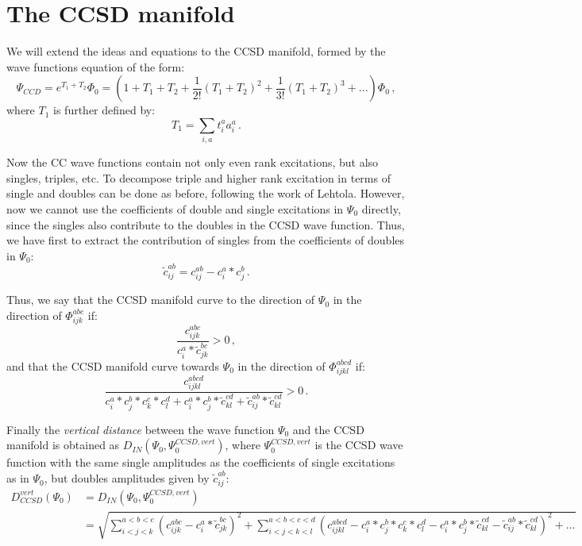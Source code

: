 \section{The CCSD manifold}
We will extend the ideas and equations to the CCSD manifold, formed by the wave functions equation
of the form:
\begin{equation}
  \Psi_{CCD} = e^{T_1 + T_2} \Phi_0 =
  \left(1 + T_1 + T_2 + \frac{1}{2!}(T_1 + T_2)^2 + \frac{1}{3!}(T_1 + T_2)^3 + ...\right) \Phi_0\,,
\end{equation}
where $T_1$ is further defined by:
\begin{equation}
  T_1 = \sum_{i,a} t_i^a a_i^a\,.
\end{equation}

Now the CC wave functions contain not only even rank excitations,
but also singles, triples, etc.
To decompose triple and higher rank excitation in terms of single and doubles can be done
as before, following the work of Lehtola.
However, now we cannot use the coefficients of double and single excitations in $\Psi_0$
directly, since the singles also contribute to the doubles in the CCSD wave function.
Thus,
we have first to extract the contribution of singles from the coefficients of doubles in $\Psi_0$:
\begin{equation}
  \tilde{c}_{ij}^{ab} = c_{ij}^{ab} - c_i^a * c_j^b\,.
\end{equation}

Thus, we say that the CCSD manifold curve to the direction of $\Psi_0$ in the direction of
$\Phi_{ijk}^{abc}$ if:
\begin{equation}
  \frac{c_{ijk}^{abc}}{c_{i}^{a} * \tilde{c}_{jk}^{bc}} > 0\,,
\end{equation}
and that the CCSD manifold curve towards $\Psi_0$ in the direction of
$\Phi_{ijkl}^{abcd}$ if:
\begin{equation}
  \frac{c_{ijkl}^{abcd}}
  {c_{i}^{a} * c_{j}^{b} * c_{k}^{c} * c_{l}^{d}
    + c_{i}^{a} * c_{j}^{b} * \tilde{c}_{kl}^{cd}
    + \tilde{c}_{ij}^{ab} * \tilde{c}_{kl}^{cd}} > 0\,.
\end{equation}

Finally the \emph{vertical distance} between the wave function $\Psi_0$ and the CCSD manifold is obtained as
$D_{IN}(\Psi_0, \Psi_0^{CCSD,vert})$, where $\Psi_0^{CCSD,vert}$ is the CCSD wave function
with the same single amplitudes as the coefficients of single excitations as in $\Psi_0$,
but doubles amplitudes given by $\tilde{c}_{ij}^{ab}$:
\begin{equation}
  \begin{split}
    D_{CCSD}^{vert}(\Psi_0) &= 
    D_{IN}(\Psi_0, \Psi_0^{CCSD,vert})\\
    &= \sqrt{
      \sum_{i<j<k}^{a<b<c}
      (c_{ijk}^{abc} - c_{i}^{a} * \tilde{c}_{jk}^{bc})^2
      + \sum_{i<j<k<l}^{a<b<c<d}
      (c_{ijkl}^{abcd}
      - c_{i}^{a} * c_{j}^{b} * c_{k}^{c} * c_{l}^{d}
      - c_{i}^{a} * c_{j}^{b} * \tilde{c}_{kl}^{cd}
      - \tilde{c}_{ij}^{ab} * \tilde{c}_{kl}^{cd})^2 + \dots
    }
  \end{split}
\end{equation}





